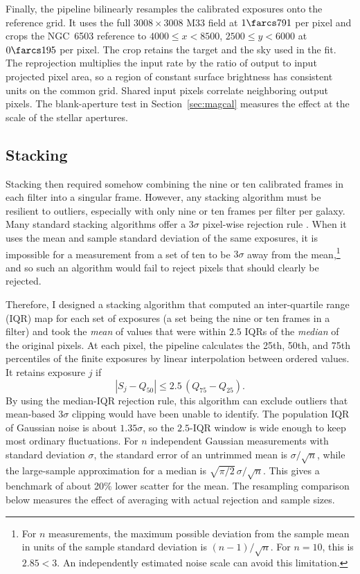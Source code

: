 Finally, the pipeline bilinearly resamples the calibrated exposures onto the reference grid. It uses the full $3008\times3008$ M33 field at $1\farcs791$ per pixel and crops the NGC~6503 reference to $4000\le x<8500$, $2500\le y<6000$ at $0\farcs195$ per pixel. The crop retains the target and the sky used in the fit. The reprojection multiplies the input rate by the ratio of output to input projected pixel area, so a region of constant surface brightness has consistent units on the common grid. Shared input pixels correlate neighboring output pixels. The blank-aperture test in Section~\ref{sec:magcal} measures the effect at the scale of the stellar apertures.

\subsection{Stacking}
\label{sec:stacking}

Stacking then required somehow combining the nine or ten calibrated frames in each filter into a singular frame. However, any stacking algorithm must be resilient to outliers, especially with only nine or ten frames per filter per galaxy. Many standard stacking algorithms offer a $3\sigma$ pixel-wise rejection rule \citep{methCCDProc}. When it uses the mean and sample standard deviation of the same exposures, it is impossible for a measurement from a set of ten to be $3\sigma$ away from the mean,\footnote{For $n$ measurements, the maximum possible deviation from the sample mean in units of the sample standard deviation is $(n-1)/\sqrt{n}$. For $n=10$, this is $2.85<3$. An independently estimated noise scale can avoid this limitation.} and so such an algorithm would fail to reject pixels that should clearly be rejected.

Therefore, I designed a stacking algorithm that computed an inter-quartile range (IQR) map for each set of exposures (a set being the nine or ten frames in a filter) and took the \textit{mean} of values that were within $2.5$ IQRs of the \textit{median} of the original pixels. At each pixel, the pipeline calculates the 25th, 50th, and 75th percentiles of the finite exposures by linear interpolation between ordered values. It retains exposure $j$ if
\begin{equation}
    |S_j-Q_{50}| \leq 2.5\,(Q_{75}-Q_{25}).
    \label{eq:iqr}
\end{equation}
By using the median-IQR rejection rule, this algorithm can exclude outliers that mean-based $3\sigma$ clipping would have been unable to identify. The population IQR of Gaussian noise is about $1.35\sigma$, so the $2.5$-IQR window is wide enough to keep most ordinary fluctuations. For $n$ independent Gaussian measurements with standard deviation $\sigma$, the standard error of an untrimmed mean is $\sigma/\sqrt{n}$, while the large-sample approximation for a median is $\sqrt{\pi/2}\,\sigma/\sqrt{n}$. This gives a benchmark of about 20\% lower scatter for the mean. The resampling comparison below measures the effect of averaging with actual rejection and sample sizes.

